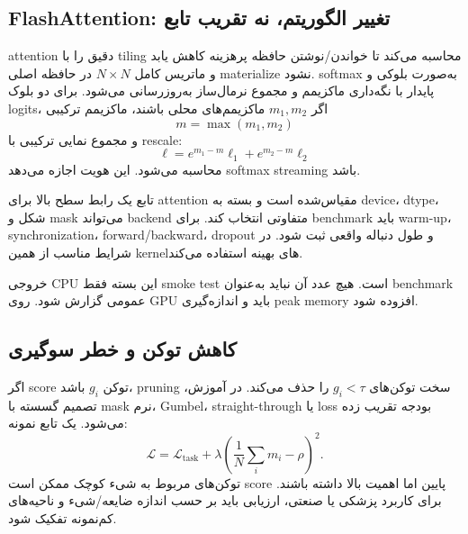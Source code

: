 \documentclass[12pt,openany,oneside]{book}
\begin{document}
\subsection{FlashAttention: تغییر الگوریتم، نه تقریب تابع}
 attention دقیق را با tiling محاسبه می‌کند تا خواندن/نوشتن حافظه پرهزینه کاهش یابد و ماتریس کامل $N\times N$ در حافظه اصلی materialize نشود. softmax به‌صورت بلوکی و پایدار با نگه‌داری ماکزیمم و مجموع نرمال‌ساز به‌روزرسانی می‌شود. برای دو بلوک logits، اگر $m_1,m_2$ ماکزیمم‌های محلی باشند، ماکزیمم ترکیبی
\begin{equation}
m=\max(m_1,m_2)
\end{equation}
و مجموع نمایی ترکیبی با rescale:
\begin{equation}
\ell=e^{m_1-m}\ell_1+e^{m_2-m}\ell_2
\end{equation}
محاسبه می‌شود. این هویت اجازه می‌دهد softmax streaming باشد.

\begin{librarybox}
تابع  یک رابط سطح بالا برای attention مقیاس‌شده است و بسته به device، dtype، شکل و mask می‌تواند backend متفاوتی انتخاب کند. برای benchmark باید warm-up، synchronization، forward/backward، dropout و طول دنباله واقعی ثبت شود.  در شرایط مناسب از همین kernelهای بهینه استفاده می‌کند.
\end{librarybox}

\begin{workshopbox}
\begin{latin}

\end{latin}
خروجی CPU این بسته فقط smoke test است. هیچ عدد آن نباید به‌عنوان benchmark عمومی گزارش شود. روی GPU باید  و اندازه‌گیری peak memory افزوده شود.
\end{workshopbox}

\subsection{کاهش توکن و خطر سوگیری}
اگر score توکن $g_i$ باشد، pruning سخت توکن‌های $g_i<\tau$ را حذف می‌کند. در آموزش، تصمیم گسسته با mask نرم، Gumbel، straight-through یا loss بودجه تقریب زده می‌شود. یک تابع نمونه:
\begin{equation}
\mathcal L=\mathcal L_{\mathrm{task}}+\lambda\left(\frac{1}{N}\sum_i m_i-\rho\right)^2.
\end{equation}
توکن‌های مربوط به شیء کوچک ممکن است score پایین اما اهمیت بالا داشته باشند. برای کاربرد پزشکی یا صنعتی، ارزیابی باید بر حسب اندازه ضایعه/شیء و ناحیه‌های کم‌نمونه تفکیک شود.
\end{document}
